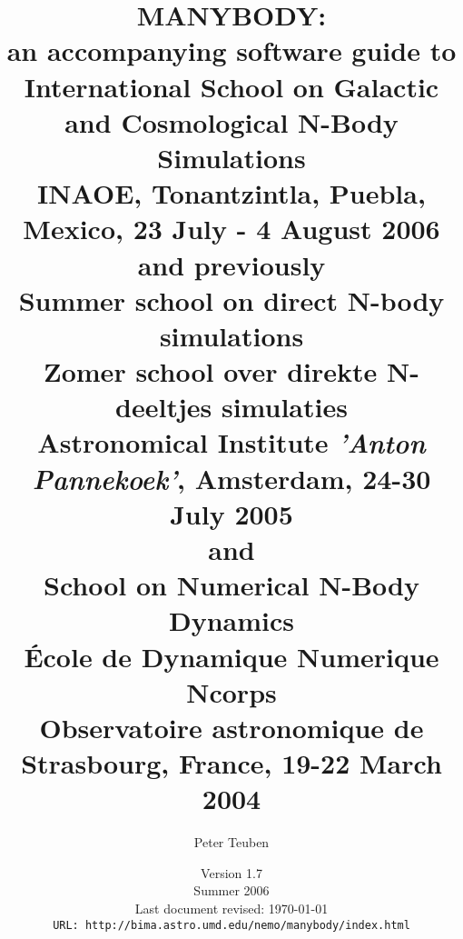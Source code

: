 

\nonstopmode			%

\documentclass[headsepline,normalheadings]{book}



\usepackage{epsfig}


\usepackage{html}
\usepackage{nemo}

\title{ 
{\Huge MANYBODY:} \\
           {\LARGE an accompanying software guide to }\\
	   {\bf  International School on Galactic and Cosmological N-Body Simulations} \\
  	   { INAOE, Tonantzintla, Puebla, Mexico, 23 July - 4 August 2006}\\
	   {\small and previously} \\
	   {\bf  Summer school on direct N-body simulations} \\
	   {\bf  Zomer school over direkte N-deeltjes simulaties} \\
	   { Astronomical Institute {\it 'Anton Pannekoek'}, Amsterdam, 24-30 July 2005}\\
	   {\small and} \\
	   { \bf School on Numerical N-Body Dynamics }\\
	   { \bf \'Ecole de Dynamique Numerique Ncorps }\\
           { Observatoire astronomique de Strasbourg, France, 19-22 March 2004}
}


\author{
 {Peter Teuben } \\
       }

\date{{\small Version 1.7} \\
      {\small Summer 2006} \\
      {\small Last document revised: \today} \\ 
      {\small \tt URL: http://bima.astro.umd.edu/nemo/manybody/index.html} \\
     }

\def\eps@scaling{1.0}%
\newcommand\epsscale[1]{\gdef\eps@scaling{#1}}%
\newcommand\plotone[1]{%
 \typeout{Plotone included the file #1}
 \centering
 \leavevmode
 \texttt{[image: \#1]}%
}%

